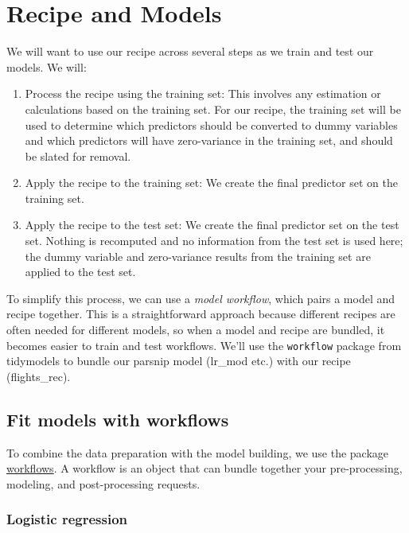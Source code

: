 \documentclass[
]{book}
\begin{document}
\hypertarget{recipe-and-models}{%
\chapter{Recipe and Models}\label{recipe-and-models}}

We will want to use our recipe across several steps as we train and test our models. We will:

\begin{enumerate}
\def\labelenumi{\arabic{enumi}.}
\item
  Process the recipe using the training set: This involves any estimation or calculations based on the training set. For our recipe, the training set will be used to determine which predictors should be converted to dummy variables and which predictors will have zero-variance in the training set, and should be slated for removal.
\item
  Apply the recipe to the training set: We create the final predictor set on the training set.
\item
  Apply the recipe to the test set: We create the final predictor set on the test set. Nothing is recomputed and no information from the test set is used here; the dummy variable and zero-variance results from the training set are applied to the test set.
\end{enumerate}

To simplify this process, we can use a \emph{model workflow}, which pairs a model and recipe together. This is a straightforward approach because different recipes are often needed for different models, so when a model and recipe are bundled, it becomes easier to train and test workflows. We'll use the \texttt{workflow} package from tidymodels to bundle our parsnip model (lr\_mod etc.) with our recipe (flights\_rec).

\hypertarget{fit-models-with-workflows}{%
\section{Fit models with workflows}\label{fit-models-with-workflows}}

To combine the data preparation with the model building, we use the package \href{https://workflows.tidymodels.org}{workflows}. A workflow is an object that can bundle together your pre-processing, modeling, and post-processing requests.

\hypertarget{logistic-regression-1}{%
\subsection{Logistic regression}\label{logistic-regression-1}}
\end{document}
